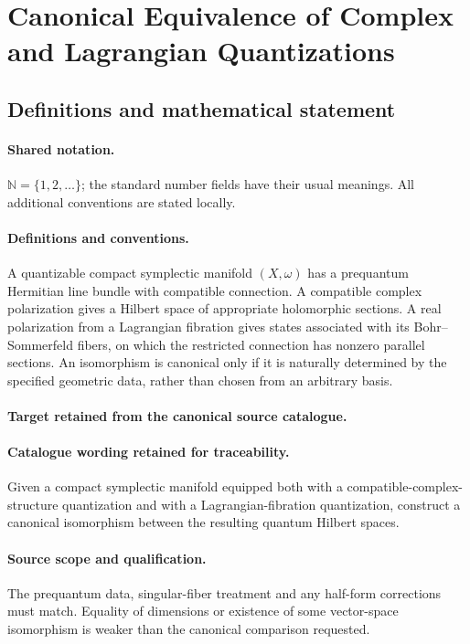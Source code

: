 \documentclass[11pt]{article}
\begin{document}
\section{Canonical Equivalence of Complex and Lagrangian Quantizations}\label{statement}

\subsection{Definitions and mathematical statement}

\paragraph{Shared notation.}$\mathbb N=\{1,2,\ldots\}$; the standard number fields have their usual meanings. All additional conventions are stated locally.


\paragraph{Definitions and conventions.}
A quantizable compact symplectic manifold $(X,\omega)$ has a prequantum Hermitian line bundle with compatible connection. A compatible complex polarization gives a Hilbert space of appropriate holomorphic sections. A real polarization from a Lagrangian fibration gives states associated with its Bohr--Sommerfeld fibers, on which the restricted connection has nonzero parallel sections. An isomorphism is canonical only if it is naturally determined by the specified geometric data, rather than chosen from an arbitrary basis.

\paragraph{Target retained from the canonical source catalogue.}
\paragraph{Catalogue wording retained for traceability.}
Given a compact symplectic manifold equipped both with a compatible-complex-structure quantization and with a Lagrangian-fibration quantization, construct a canonical isomorphism between the resulting quantum Hilbert spaces.

\paragraph{Source scope and qualification.}
The prequantum data, singular-fiber treatment and any half-form corrections must match. Equality of dimensions or existence of some vector-space isomorphism is weaker than the canonical comparison requested.
\end{document}
